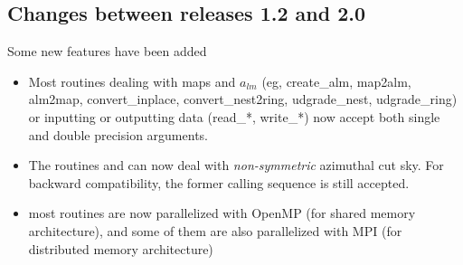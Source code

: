 \documentclass[12pt,twoside]{article}
\renewcommand{\ell}{l}
\begin{document}
{\begin{itemize}
\end{itemize}

\subsection[Changes between releases 1.2 and 2.0]{Changes between releases 1.2 and 2.0}
Some new features have been added
\begin{itemize}
\item Most routines dealing with maps and $a_{\ell m}$ (eg, create\_alm, map2alm, alm2map,
  convert\_inplace, convert\_nest2ring, udgrade\_nest, udgrade\_ring) or inputting or outputting  data (read\_*, write\_*)
 now accept both single and double precision arguments.
\item The routines  and   can now deal with
  {\em non-symmetric} azimuthal cut sky. For backward compatibility, the former calling sequence
  is still accepted.
\item most routines are now parallelized with OpenMP (for shared memory architecture), and some of them are
also parallelized with MPI (for distributed memory architecture)
\end{itemize}


}
\end{document}
